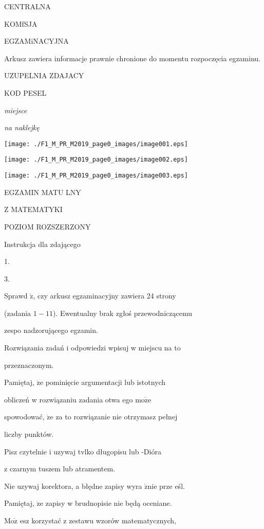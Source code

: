 \documentclass[a4paper,12pt]{article}
\begin{document}
CENTRALNA

KOMfSJA

EGZAMiNACYJNA

Arkusz zawiera informacje prawnie chronione do momentu rozpoczęcia egzaminu.

UZUPELNIA ZDAJACY

KOD PESEL

{\it miejsce}

{\it na naklejkę}
\begin{center}
\texttt{[image: ./F1\_M\_PR\_M2019\_page0\_images/image001.eps]}

\texttt{[image: ./F1\_M\_PR\_M2019\_page0\_images/image002.eps]}

\texttt{[image: ./F1\_M\_PR\_M2019\_page0\_images/image003.eps]}
\end{center}
EGZAMIN MATU LNY

Z MATEMATYKI

POZIOM ROZSZERZONY

Instrukcja dla zdającego

1.

3.

Sprawd $\acute{\mathrm{z}}$, czy arkusz egzaminacyjny zawiera 24 strony

(zadania $1-11$). Ewentualny brak zgłoś przewodniczącemu

zespo nadzorującego egzamin.

Rozwiązania zadań i odpowiedzi wpisuj w miejscu na to

przeznaczonym.

Pamiętaj, $\dot{\mathrm{z}}\mathrm{e}$ pominięcie argumentacji lub istotnych

obliczeń w rozwiązaniu zadania otwa ego $\mathrm{m}\mathrm{o}\dot{\mathrm{z}}\mathrm{e}$

spowodować, $\dot{\mathrm{z}}\mathrm{e}$ za to rozwiązanie nie otrzymasz pełnej

liczby punktów.

Pisz czytelnie i uzywaj tvlko długopisu lub -Dióra

z czarnym tuszem lub atramentem.

Nie uzywaj korektora, a błędne zapisy wyra $\acute{\mathrm{z}}\mathrm{n}\mathrm{i}\mathrm{e}$ prze eśl.

Pamiętaj, $\dot{\mathrm{z}}\mathrm{e}$ zapisy w brudnopisie nie będą oceniane.

$\mathrm{M}\mathrm{o}\dot{\mathrm{z}}$ esz korzystać z zestawu wzorów matematycznych,
\end{document}
